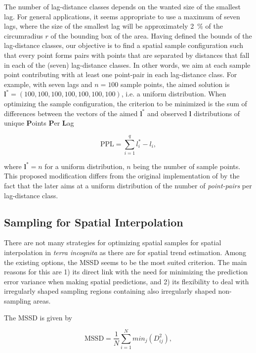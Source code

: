 The number of lag-distance classes depends on the wanted size of the smallest lag. For general 
applications, it seems appropriate to use a maximum of seven lags, where the size of the smallest lag will be 
approximately \SI{2}{\percent} of the circumradius $r$ of the bounding box of the area. Having defined the 
bounds of the lag-distance classes, our objective is to find a spatial sample configuration such that every 
point forms pairs with points that are separated by distances that fall in each of the (seven) lag-distance 
classes. In other words, we aim at each sample point contributing with at least one point-pair in each 
lag-distance class. For example, with seven lags and $n = 100$ sample points, the aimed solution is 
$\boldsymbol{l}^* = (100, 100, 100, 100, 100, 100, 100)$, i.e. a uniform distribution. When optimizing the 
sample configuration, the criterion to be minimized is the sum of differences between the vectors of the aimed 
$\boldsymbol{l}^*$ and observed $\boldsymbol{l}$ distributions of unique \textbf{P}oints \textbf{P}er 
\textbf{L}ag

\begin{equation}\label{eqn:chap08-ppl}
 \text{PPL} = \sum_{i = 1}^{q} l_i^* - l_i,
\end{equation}

\noindent where $\boldsymbol{l}^* = n$ for a uniform distribution, $n$ being the number of sample points. This 
proposed modification differs from the original implementation of \citet{WarrickEtAl1987} by the fact that the 
later aims at a uniform distribution of the number of \emph{point-pairs} per lag-distance class.

\subsection{Sampling for Spatial Interpolation}

There are not many strategies for optimizing spatial samples for spatial interpolation in \emph{terra 
incognita} as there are for spatial trend estimation. Among the existing options, the MSSD seems to be the most
suited criterion. The main reasons for this are 1) its direct link with the need for minimizing the prediction 
error variance when making spatial predictions, and 2) its flexibility to deal with irregularly shaped sampling
regions containing also irregularly shaped non-sampling areas.

The MSSD is given by

\begin{equation}
 \text{MSSD} = \frac{1}{N} \sum_{i = 1}^{N} min_j(D_{ij}^2),
\end{equation}

